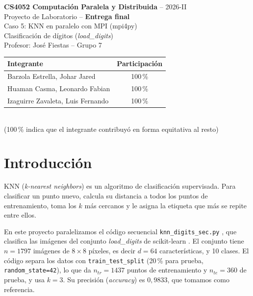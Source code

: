 \documentclass[11pt,a4paper]{article}
\newcommand{\ntr}{n_{tr}}
\newcommand{\nte}{n_{te}}
\begin{document}
\begin{center}
  {\large \textbf{CS4052 Computación Paralela y Distribuida} -- 2026-II}\\[2pt]
  Proyecto de Laboratorio -- \textbf{Entrega final}\\[6pt]
  {\LARGE Caso 5: KNN en paralelo con MPI (mpi4py)}\\[4pt]
  Clasificación de dígitos (\textit{load\_digits})\\[6pt]
  Profesor: José Fiestas \quad -- \quad Grupo 7
\end{center}

\begin{center}
\begin{tabular}{lc}
  \toprule
  \textbf{Integrante} & \textbf{Participación} \\
  \midrule
  Barzola Estrella, Johar Jared   & 100\,\% \\
  Huaman Casma, Leonardo Fabian   & 100\,\% \\
  Izaguirre Zavaleta, Luis Fernando & 100\,\% \\
  \bottomrule
\end{tabular}\\[3pt]
{\small (100\,\% indica que el integrante contribuyó en forma equitativa al resto)}
\end{center}

\section{Introducción}

KNN (\textit{k-nearest neighbors}) es un algoritmo de clasificación supervisada. Para clasificar un punto nuevo, calcula su distancia a todos los puntos de entrenamiento, toma los $k$ más cercanos y le asigna la etiqueta que más se repite entre ellos.

En este proyecto paralelizamos el código secuencial \texttt{knn\_digits\_sec.py} \cite{base}, que clasifica las imágenes del conjunto \textit{load\_digits} de scikit-learn \cite{sklearn}. El conjunto tiene $n=1797$ imágenes de $8\times 8$ píxeles, es decir $d=64$ características, y 10 clases. El código separa los datos con \texttt{train\_test\_split} (20\,\% para prueba, \texttt{random\_state=42}), lo que da $\ntr=1437$ puntos de entrenamiento y $\nte=360$ de prueba, y usa $k=3$. Su precisión (\textit{accuracy}) es $0{,}9833$, que tomamos como referencia.
\end{document}
